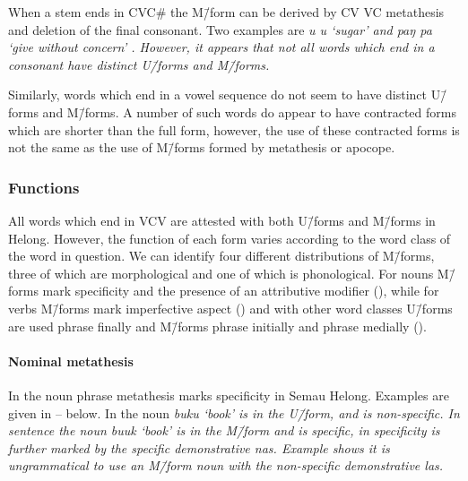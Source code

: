 When a stem ends in CVC{\#} the M\=/form
can be derived by CV {\ra} VC metathesis and deletion of the final consonant.
Two examples are \it{u} {\ra} \it{u} `sugar'
and \it{paŋ} {\ra} \it{pa} `give without concern' \citep[47]{ba17b}.
However, it appears that not all words which end
in a consonant have distinct U\=/forms and M\=/forms.

Similarly, words which end in a vowel sequence
do not seem to have distinct U\=/forms and M\=/forms.
A number of such words do appear to have contracted forms which are shorter than the full form,
however, the use of these contracted forms is not the same as the use
of M\=/forms formed by metathesis or apocope.

\subsubsection{Functions}\label{sec:HelFun}
All words which end in VCV are attested with both U\=/forms and M\=/forms in Helong.
However, the function of each form varies according to the word class of the word in question.
We can identify four different distributions of M\=/forms,
three of which are morphological and one of which is phonological.
For nouns M\=/forms mark specificity
and the presence of an attributive modifier (),
while for verbs M\=/forms mark imperfective aspect ()
and with other word classes U\=/forms are used phrase finally
and M\=/forms phrase initially and phrase medially ().

\paragraph{Nominal metathesis}\label{sec:MetNP}
In the noun phrase metathesis marks specificity in Semau Helong.
Examples are given in -- below.
In  the noun \it{buku} `book' is in the U\=/form, and is non-specific.
In sentence  the noun \it{buuk}
`book' is in the M\=/form and is specific,
in  specificity is further marked by the specific demonstrative \it{nas}.
Example  shows it is ungrammatical to use an M\=/form noun
with the non-specific demonstrative \it{las}.

